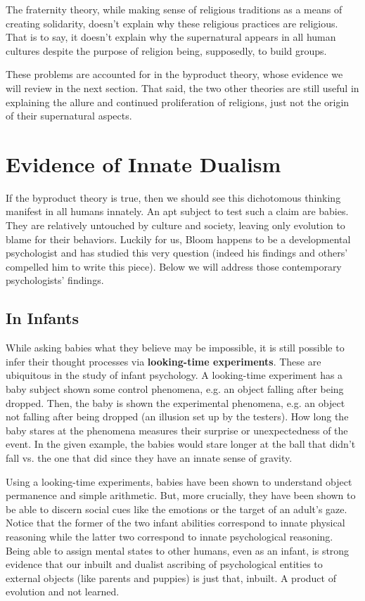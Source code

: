 \documentclass{article}
\begin{document}
The fraternity theory, while making sense of religious traditions as a means of creating solidarity, doesn't explain why these religious practices are religious. That is to say, it doesn't explain why the supernatural appears in all human cultures despite the purpose of religion being, supposedly, to build groups.

These problems are accounted for in the byproduct theory, whose evidence we will review in the next section. That said, the two other theories are still useful in explaining the allure and continued proliferation of religions, just not the origin of their supernatural aspects.

\section{Evidence of Innate Dualism}
If the byproduct theory is true, then we should see this dichotomous thinking manifest in all humans innately. An apt subject to test such a claim are babies. They are relatively untouched by culture and society, leaving only evolution to blame for their behaviors. Luckily for us, Bloom happens to be a developmental psychologist and has studied this very question (indeed his findings and others' compelled him to write this piece). Below we will address those contemporary psychologists' findings.

\subsection{In Infants}
While asking babies what they believe may be impossible, it is still possible to infer their thought processes via \textbf{looking-time experiments}. These are ubiquitous in the study of infant psychology. A looking-time experiment has a baby subject shown some control phenomena, e.g. an object falling after being dropped. Then, the baby is shown the experimental phenomena, e.g. an object not falling after being dropped (an illusion set up by the testers). How long the baby stares at the phenomena measures their surprise or unexpectedness of the event. In the given example, the babies would stare longer at the ball that didn't fall vs. the one that did since they have an innate sense of gravity.

Using a looking-time experiments, babies have been shown to understand object permanence and simple arithmetic. But, more crucially, they have been shown to be able to discern social cues like the emotions or the target of an adult's gaze. Notice that the former of the two infant abilities correspond to innate physical reasoning while the latter two correspond to innate psychological reasoning. Being able to assign mental states to other humans, even as an infant, is strong evidence that our inbuilt and dualist ascribing of psychological entities to external objects (like parents and puppies) is just that, inbuilt. A product of evolution and not learned.
\end{document}
